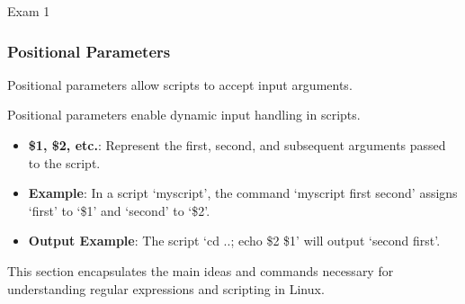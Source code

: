 \begin{examnotes}{Exam 1}
    \subsubsection*{Positional Parameters}

    Positional parameters allow scripts to accept input arguments.

    \begin{highlight}
        Positional parameters enable dynamic input handling in scripts.
        
        \begin{itemize}
            \item \textbf{\$1, \$2, etc.}: Represent the first, second, and subsequent arguments passed to the script.
            \item \textbf{Example}: In a script `myscript', the command `myscript first second' assigns `first' to `\$1' and `second' to `\$2'.
            \item \textbf{Output Example}: The script `cd ..; echo \$2 \$1' will output `second first'.
        \end{itemize}
    \end{highlight}

    \begin{highlight}
        This section encapsulates the main ideas and commands necessary for understanding regular expressions and scripting in Linux.
        

\end{highlight}
\end{examnotes}
